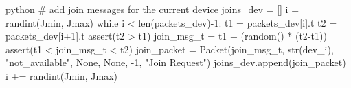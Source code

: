 \begin{mintedbox}{python}       
# add join messages for the current device
joins_dev = []
i = randint(Jmin, Jmax)
while i < len(packets_dev)-1:
    t1 = packets_dev[i].t
    t2 = packets_dev[i+1].t
    assert(t2 > t1)
    join_msg_t = t1 + (random() * (t2-t1))
    assert(t1 < join_msg_t < t2)
    join_packet = Packet(join_msg_t, str(dev_i), "not_available", None, None, -1, "Join Request")
    joins_dev.append(join_packet)
    i += randint(Jmin, Jmax)
\end{mintedbox}